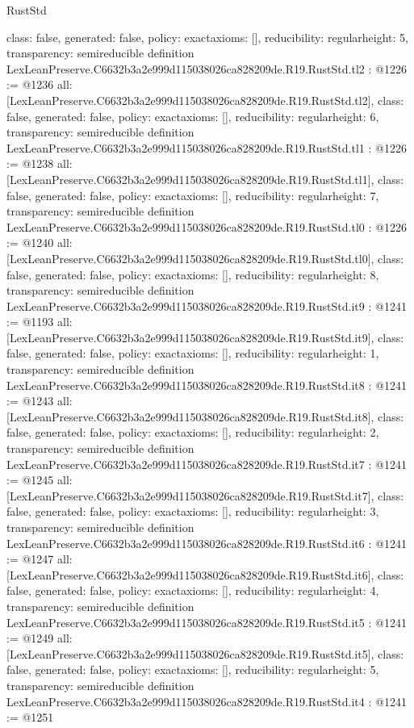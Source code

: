 \begin{lexlean}{RustStd}
\begin{coremodule}
{  class: false,
  generated: false,
  policy: exact{axioms: []},
  reducibility: regular{height: 5},
  transparency: semireducible
}
definition LexLeanPreserve.C6632b3a2e999d115038026ca828209de.R19.RustStd.tl2 : @1226 := @1236 {
  all: [LexLeanPreserve.C6632b3a2e999d115038026ca828209de.R19.RustStd.tl2],
  class: false,
  generated: false,
  policy: exact{axioms: []},
  reducibility: regular{height: 6},
  transparency: semireducible
}
definition LexLeanPreserve.C6632b3a2e999d115038026ca828209de.R19.RustStd.tl1 : @1226 := @1238 {
  all: [LexLeanPreserve.C6632b3a2e999d115038026ca828209de.R19.RustStd.tl1],
  class: false,
  generated: false,
  policy: exact{axioms: []},
  reducibility: regular{height: 7},
  transparency: semireducible
}
definition LexLeanPreserve.C6632b3a2e999d115038026ca828209de.R19.RustStd.tl0 : @1226 := @1240 {
  all: [LexLeanPreserve.C6632b3a2e999d115038026ca828209de.R19.RustStd.tl0],
  class: false,
  generated: false,
  policy: exact{axioms: []},
  reducibility: regular{height: 8},
  transparency: semireducible
}
definition LexLeanPreserve.C6632b3a2e999d115038026ca828209de.R19.RustStd.it9 : @1241 := @1193 {
  all: [LexLeanPreserve.C6632b3a2e999d115038026ca828209de.R19.RustStd.it9],
  class: false,
  generated: false,
  policy: exact{axioms: []},
  reducibility: regular{height: 1},
  transparency: semireducible
}
definition LexLeanPreserve.C6632b3a2e999d115038026ca828209de.R19.RustStd.it8 : @1241 := @1243 {
  all: [LexLeanPreserve.C6632b3a2e999d115038026ca828209de.R19.RustStd.it8],
  class: false,
  generated: false,
  policy: exact{axioms: []},
  reducibility: regular{height: 2},
  transparency: semireducible
}
definition LexLeanPreserve.C6632b3a2e999d115038026ca828209de.R19.RustStd.it7 : @1241 := @1245 {
  all: [LexLeanPreserve.C6632b3a2e999d115038026ca828209de.R19.RustStd.it7],
  class: false,
  generated: false,
  policy: exact{axioms: []},
  reducibility: regular{height: 3},
  transparency: semireducible
}
definition LexLeanPreserve.C6632b3a2e999d115038026ca828209de.R19.RustStd.it6 : @1241 := @1247 {
  all: [LexLeanPreserve.C6632b3a2e999d115038026ca828209de.R19.RustStd.it6],
  class: false,
  generated: false,
  policy: exact{axioms: []},
  reducibility: regular{height: 4},
  transparency: semireducible
}
definition LexLeanPreserve.C6632b3a2e999d115038026ca828209de.R19.RustStd.it5 : @1241 := @1249 {
  all: [LexLeanPreserve.C6632b3a2e999d115038026ca828209de.R19.RustStd.it5],
  class: false,
  generated: false,
  policy: exact{axioms: []},
  reducibility: regular{height: 5},
  transparency: semireducible
}
definition LexLeanPreserve.C6632b3a2e999d115038026ca828209de.R19.RustStd.it4 : @1241 := @1251 {
}
\end{coremodule}
\end{lexlean}
